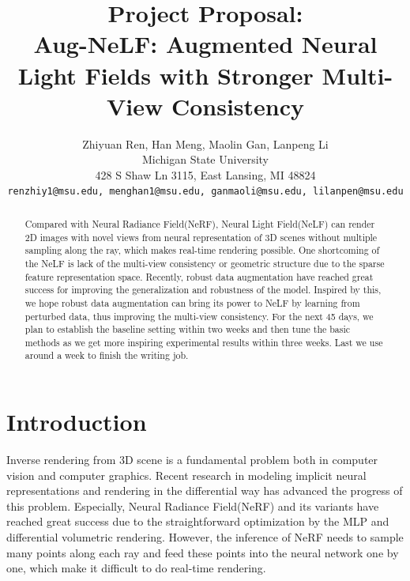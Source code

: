 \documentclass[10pt,twocolumn,letterpaper]{article}
\begin{document}
\title{Project Proposal: \\Aug-NeLF: Augmented Neural Light Fields with Stronger Multi-View Consistency}

\author{Zhiyuan Ren, Han Meng, Maolin Gan, Lanpeng Li\\
Michigan State University\\
428 S Shaw Ln 3115, East Lansing, MI 48824\\
{\tt\small renzhiy1@msu.edu, menghan1@msu.edu, ganmaoli@msu.edu, lilanpen@msu.edu}
}
\maketitle

\begin{abstract}
   Compared with Neural Radiance Field(NeRF), Neural Light Field(NeLF) can render 2D images with novel views from neural representation of 3D scenes without multiple sampling along the ray, which makes real-time rendering possible. One shortcoming of the NeLF is lack of the multi-view consistency or geometric structure due to the sparse feature representation space. Recently, robust data augmentation have reached great success for improving the generalization and robustness of the model. Inspired by this, we hope robust data augmentation can bring its power to NeLF by learning from perturbed data, thus improving the multi-view consistency. For the next 45 days, we plan to establish the baseline setting within two weeks and then tune the basic methods as we get more inspiring experimental results within three weeks. Last we use around a week to finish the writing job.
\end{abstract}

%  
\section{Introduction}
\label{sec:intro}
Inverse rendering from 3D scene is a fundamental problem both in computer vision and computer graphics. Recent research in modeling implicit neural representations \cite{dellaert2020neural, mescheder2019occupancy, park2019deepsdf, takikawa2021neural} and rendering in the differential way \cite{mildenhall2021nerf} has advanced the progress of this problem. Especially, Neural Radiance Field(NeRF) and its variants have reached great success due to the straightforward optimization by the MLP and differential volumetric rendering. However, the inference of NeRF needs to sample many points along each ray and feed these points into the neural network one by one, which make it difficult to do real-time rendering.
\end{document}
